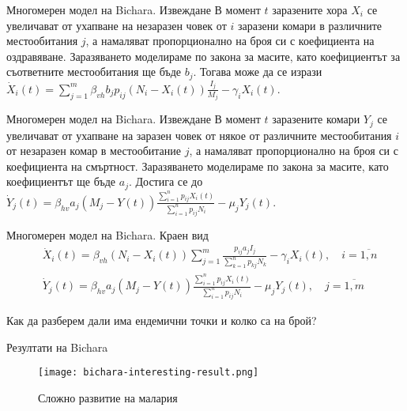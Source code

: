 \begin{frame}[t]{Многомерен модел на Bichara. Извеждане}
  В момент $t$ заразените хора $X_i$ се увеличават от ухапване на незаразен човек от $i$ заразени комари в различните местообитания $j$, а намаляват пропорционално на броя си с коефициента на оздравяване. Заразяването моделираме по закона за масите, като коефициентът за съответните местообитания ще бъде $b_j$. Тогава може да се изрази $\dot{X}_i(t) = \sum_{j=1}^{m} \beta_{vh} b_j p_{ij} (N_i - X_i(t)) \frac{I_j}{M_j} - \gamma_i X_i(t)$.
\end{frame}

\begin{frame}[t]{Многомерен модел на Bichara. Извеждане}
  В момент $t$ заразените комари $Y_j$ се увеличават от ухапване на заразен човек от някое от различните местообитания $i$ от незаразен комар в местообитание $j$, а намаляват пропорционално на броя си с коефициента на смъртност. Заразяването моделираме по закона за масите, като коефициентът ще бъде $a_j$. Достига се до $\dot{Y}_j(t) = \beta_{hv} a_j (M_j - Y(t)) \frac{\sum_{i=1}^n p_{ij} X_i(t)}{\sum_{i=1}^n p_{ij} N_i} - \mu_j Y_j(t)$.
\end{frame}

\begin{frame}[t]{Многомерен модел на Bichara. Краен вид}
  \begin{equation}
    \label{eq:MigrationProblem}
    \begin{split}
      &\dot{X}_i(t) = \beta_{vh} (N_i - X_i(t)) \sum_{j=1}^{m} \frac{p_{ij} a_j I_j}{\sum_{k=1}^n p_{kj} N_k} - \gamma_i X_i(t), \quad i=\overline{1, n} \\
      &\dot{Y}_j(t) = \beta_{hv} a_j (M_j - Y(t)) \frac{\sum_{i=1}^n p_{ij} X_i(t)}{\sum_{i=1}^n p_{ij} N_i} - \mu_j Y_j(t), \quad j=\overline{1, m}
    \end{split}
  \end{equation}

  Как да разберем дали има ендемични точки и колко са на брой?
\end{frame}

\begin{frame}[t]{Резултати на Bichara}
  \begin{figure}[h]
    \centering
    \texttt{[image: bichara-interesting-result.png]}
    \caption{Сложно развитие на малария}
  \end{figure}
\end{frame}
